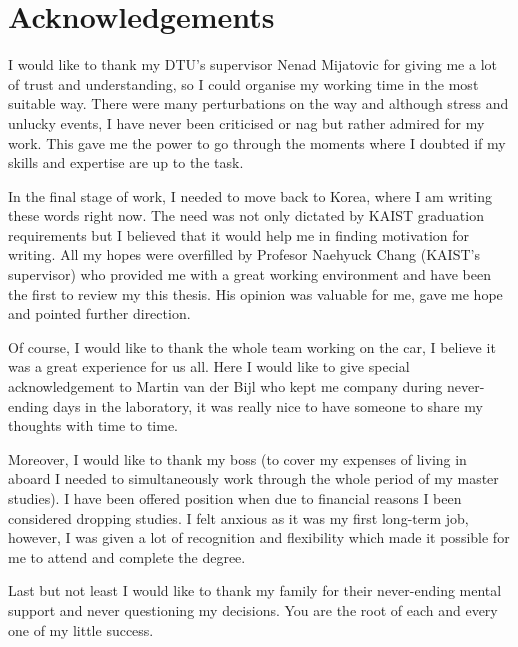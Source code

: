 \chapter{Acknowledgements}

I would like to thank my DTU's supervisor Nenad Mijatovic for giving me a lot of trust and understanding, so I could organise my working time in the most suitable way. There were many perturbations on the way and although stress and unlucky events, I have never been criticised or nag but rather admired for my work. This gave me the power to go through the moments where I doubted if my skills and expertise are up to the task.

In the final stage of work, I needed to move back to Korea, where I am writing these words right now. The need was not only dictated by KAIST graduation requirements but I believed that it would help me in finding motivation for writing. All my hopes were overfilled by Profesor Naehyuck Chang (KAIST's supervisor) who provided me with a great working environment and have been the first to review my this thesis. His opinion was valuable for me, gave me hope and pointed further direction.

Of course, I would like to thank the whole team working on the car, I believe it was a great experience for us all. Here I would like to give special acknowledgement to Martin van der Bijl who kept me company during never-ending days in the laboratory, it was really nice to have someone to share my thoughts with time to time.

Moreover, I would like to thank my boss (to cover my expenses of living in aboard I needed to simultaneously work through the whole period of my master studies). I have been offered position when due to financial reasons I been considered dropping studies. I felt anxious as it was my first long-term job, however, I was given a lot of recognition and flexibility which made it possible for me to attend and complete the degree.

Last but not least I would like to thank my family for their never-ending mental support and never questioning my decisions. You are the root of each and every one of my little success.  